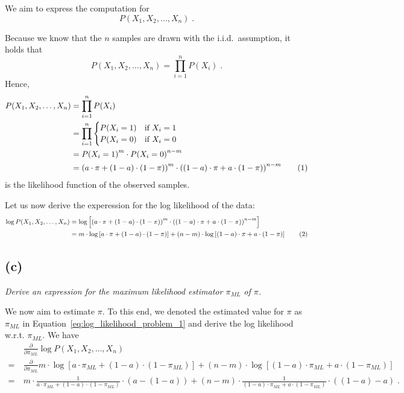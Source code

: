 \documentclass{article}
\newcommand{\stepandtag}{%
  \refstepcounter{equation}%
  \tag{\theequation}%
}
\begin{document}
We aim to express the computation for
\begin{equation*}
    P(X_1, X_2, \dots, X_n)\;.
\end{equation*}

Because we know that the $n$ samples are drawn with the i.i.d.\ assumption, it holds that
\begin{equation*}
    P(X_1, X_2, \dots, X_n) = \prod_{i=1}^{n} P(X_i)\;.
\end{equation*}
Hence,
\begin{align*}
    P(X_1, X_2, \dots, X_n) &= \prod_{i=1}^{n} P(X_i) \\
    &= \prod_{i=1}^{n} \begin{cases}
        P(X_i=1) & \text{if } X_i = 1 \\
        P(X_i = 0) & \text{if } X_i = 0
    \end{cases} \\
    &= {P(X_i=1)}^{m} \cdot {P(X_i=0)}^{n-m} \\
    &= {\left ( a \cdot \pi + (1-a) \cdot (1-\pi) \right )}^{m} \cdot {\left ( (1-a) \cdot \pi + a \cdot (1-\pi) \right )}^{n-m} 
    \stepandtag \label{eq:likelihood_problem_1}
\end{align*}
is the likelihood function of the observed samples.

Let us now derive the experession for the log likelihood of the data:
\begin{align*}
    \log P(X_1, X_2, \dots, X_n) &= \log \left [ {\left ( a \cdot \pi + (1-a) \cdot (1-\pi) \right )}^{m} \cdot {\left ( (1-a) \cdot \pi + a \cdot (1-\pi) \right )}^{n-m}\right ] \\
    &= m \cdot \log {\left [ a \cdot \pi + (1-a) \cdot (1-\pi) \right ]} + (n - m) \cdot \log \left [ (1-a) \cdot \pi + a \cdot (1-\pi) \right ] \stepandtag \label{eq:log_likelihood_problem_1}
\end{align*}


\subsection*{(c)}
\textit{Derive an expression for the maximum likelihood estimator $\pi_{ML}$ of $\pi$.}


We now aim to estimate $\pi$. To this end, we denoted the estimated value for $\pi$ as $\pi_{ML}$ in Equation~\ref{eq:log_likelihood_problem_1} and derive the log likelihood w.r.t. $\pi_{ML}$. We have
\begin{align*}
    &\frac{\partial}{\partial \pi_{ML}} \log P(X_1, X_2, \dots, X_n) \\
    =\ & \frac{\partial}{\partial \pi_{ML}} m \cdot \log {\left [ a \cdot \pi_{ML} + (1-a) \cdot (1-\pi_{ML}) \right ]} + (n - m) \cdot \log \left [ (1-a) \cdot \pi_{ML} + a \cdot (1-\pi_{ML}) \right ] \\
    =\ & m \cdot \frac{1}{a \cdot \pi_{ML} + (1-a) \cdot (1-\pi_{ML})} \cdot (a - (1-a))
    + (n - m) \cdot \frac{1}{(1-a) \cdot \pi_{ML} + a \cdot (1-\pi_{ML})} \cdot ((1-a) - a)\;.
\end{align*}
\end{document}
